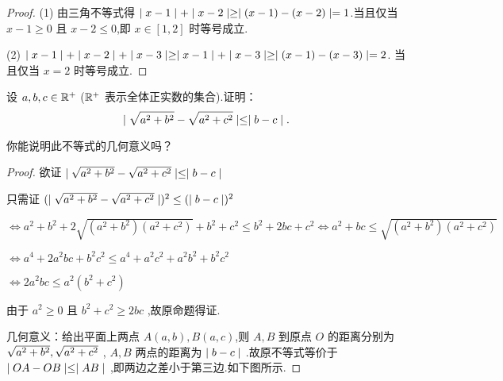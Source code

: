 \begin{proof}
    (1) 由三角不等式得 $\mid x-1 \mid + \mid x-2 \mid \ge \mid (x-1)-(x-2) \mid=1$.当且仅当 $x-1\ge 0$ 且 $x-2\le 0$,即 $x\in [1,2]$ 时等号成立.

    (2) $\mid x-1 \mid + \mid x-2 \mid + \mid x-3 \mid \ge \mid x-1 \mid + \mid x-3 \mid \ge \mid (x-1)-(x-3) \mid=2$. 当且仅当 $x = 2$ 时等号成立.
\end{proof}

\begin{practice}
    设 $a,b,c \in \mathbb{R}^+$ ($\mathbb{R}^+$ 表示全体正实数的集合).证明：
    $$\mid \sqrt{a^2+b^2}-\sqrt{a^2+c^2} \mid \le \mid b-c \mid.$$

    你能说明此不等式的几何意义吗？
\end{practice}

\begin{proof}
欲证 $\mid \sqrt{a^2+b^2}-\sqrt{a^2+c^2} \mid \le \mid b-c \mid$

只需证 $(\mid \sqrt{a^2+b^2}-\sqrt{a^2+c^2} \mid)^2 \le (\mid b-c \mid)^2$

$\iff a^2 + b^2 + 2\sqrt{(a^2+b^2)(a^2+c^2)} + b^2 + c^2 \le b^2 + 2bc + c^2\iff a^2 + bc \le \sqrt{(a^2+b^2)(a^2+c^2)}$

$\iff a^4 + 2a^2bc + b^2c^2 \le a^4 + a^2c^2 + a^2b^2 +b^2c^2$

$\iff 2a^2bc \le a^2(b^2+c^2)$

由于 $a^2\ge 0$ 且 $b^2+c^2\ge 2bc$ ,故原命题得证.

几何意义：给出平面上两点 $A(a,b),B(a,c)$,则 $A,B$ 到原点 $O$ 的距离分别为 $\sqrt{a^2+b^2},\\ \sqrt{a^2+c^2}$ , $A,B$ 两点的距离为 $\mid b-c \mid$ .故原不等式等价于 $\mid OA-OB \mid\le \mid AB \mid$ ,即两边之差小于第三边.如下图所示.

{\vspace{0.1cm}\hfill{}\hfill}

\quad
\end{proof}

